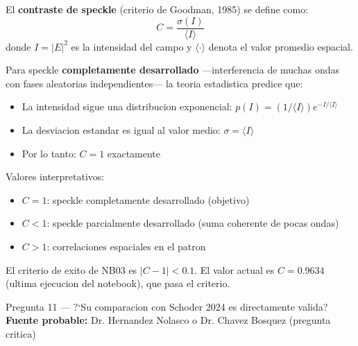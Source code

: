 \begin{answerbox}
El \textbf{contraste de speckle} (criterio de Goodman, 1985) se define como:
\[
  C = \frac{\sigma(I)}{\langle I \rangle}
\]
donde $I = |E|^2$ es la intensidad del campo y $\langle \cdot \rangle$ denota
el valor promedio espacial.

Para speckle \textbf{completamente desarrollado} ---interferencia de muchas ondas
con fases aleatorias independientes--- la teoria estadistica predice que:
\begin{itemize}
  \item La intensidad sigue una distribucion exponencial: $p(I) = (1/\langle I \rangle) e^{-I/\langle I\rangle}$
  \item La desviacion estandar es igual al valor medio: $\sigma = \langle I \rangle$
  \item Por lo tanto: $C = 1$ exactamente
\end{itemize}

Valores interpretativos:
\begin{itemize}
  \item $C = 1$: speckle completamente desarrollado (objetivo)
  \item $C < 1$: speckle parcialmente desarrollado (suma coherente de pocas ondas)
  \item $C > 1$: correlaciones espaciales en el patron
\end{itemize}

El criterio de exito de NB03 es $|C - 1| < 0.1$. El valor actual es $C = 0.9634$
(ultima ejecucion del notebook), que pasa el criterio.
\end{answerbox}

\vspace{8pt}

\begin{qabox}{Pregunta 11 --- ?`Su comparacion con Schoder 2024 es directamente valida?}
\textbf{Fuente probable:} Dr. Hernandez Nolasco o Dr. Chavez Bosquez (pregunta critica)
\end{qabox}

